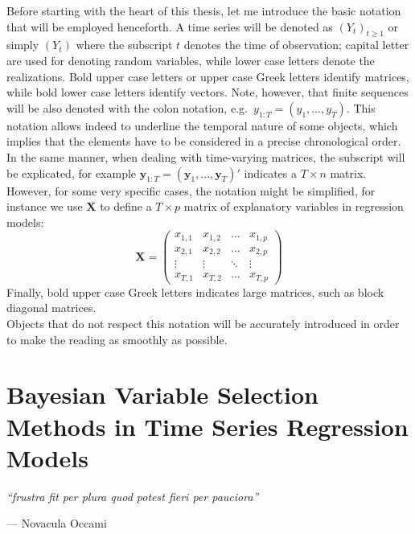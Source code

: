\documentclass[
  12pt,
]{book}
\theoremstyle{break}
\theoremstyle{nonumberplain}
\begin{document}
Before starting with the heart of this thesis, let me introduce the
basic notation that will be employed henceforth. A time series will be
denoted as \((Y_t)_{t\geq 1}\) or simply \((Y_t)\) where the subscript
\(t\) denotes the time of observation; capital letter are used for
denoting random variables, while lower case letters denote the
realizations. Bold upper case letters or upper case Greek letters
identify matrices, while bold lower case letters identify vectors. Note,
however, that finite sequences will be also denoted with the colon
notation, e.g.~\(y_{1:T} = (y_1 ,..., y_T)\). This notation allows
indeed to underline the temporal nature of some objects, which implies
that the elements have to be considered in a precise chronological
order. In the same manner, when dealing with time-varying matrices, the
subscript will be explicated, for example
\(\boldsymbol{y}_{1:T}=(\boldsymbol{y}_{1},...,\boldsymbol{y}_{T})'\)
indicates a \(T \times n\) matrix. However, for some very specific
cases, the notation might be simplified, for instance we use
\(\boldsymbol{X}\) to define a \(T\times p\) matrix of explanatory
variables in regression models: \[ \boldsymbol X = \begin{pmatrix}
  x_{1,1} & x_{1,2} & ... & x_{1,p} \\
  x_{2,1} & x_{2,2} & ... & x_{2,p} \\
  \vdots  & \vdots  & \ddots & \vdots \\
  x_{T,1} & x_{T,2} & ... & x_{T,p}
  \end{pmatrix}\] Finally, bold upper case Greek letters indicates large
matrices, such as block diagonal matrices.\\
Objects that do not respect this notation will be accurately introduced
in order to make the reading as smoothly as possible.

\mainmatter

\chapter[Bayesian Variable Selection Methods]{Bayesian Variable Selection Methods in Time Series Regression Models}\label{Bayesian Variable Selection Methods in Time Series Regression Models}

\epigraph{\emph{``frustra fit per plura quod potest fieri per pauciora''}}{--- Novacula Occami}
\end{document}

